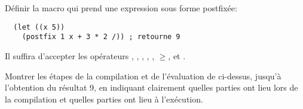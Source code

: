 \begin{Exercise}[title={Macro postfix}]
Définir la macro  qui prend une expression sous forme
postfixée:

\begin{verbatim}
  (let ((x 5))
    (postfix 1 x + 3 * 2 /)) ; retourne 9
\end{verbatim}

\noindent
Il suffira d'accepter les opérateurs \codeinline{+}, \codeinline{-}, \codeinline{*}, \codeinline{/},
, $\geq$, et .

Montrer les étapes de la compilation et de l'évaluation de
 ci-dessus, jusqu'à l'obtention du résultat 9, en indiquant
clairement quelles parties ont lieu lors de la compilation et quelles parties
ont lieu à l'exécution.
\end{Exercise}